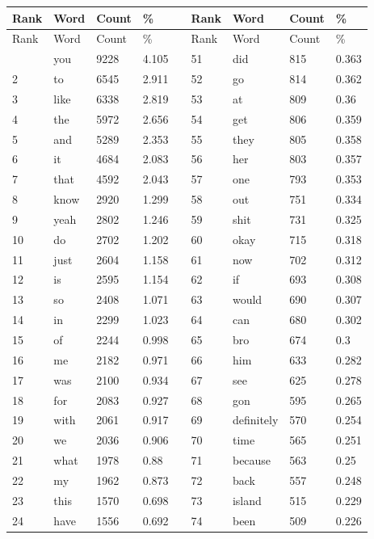 \documentclass[11pt]{article}
\begin{document}
\begin{longtable}{lllllllll}
\toprule
Rank & Word & Count & \% &  & Rank & Word & Count & \% \\
\midrule
\endfirsthead
\toprule
Rank & Word & Count & \% &  & Rank & Word & Count & \% \\
\midrule
\endhead
\bottomrule
\endlastfoot
1 & you & 9228 & 4.105 &  & 51 & did & 815 & 0.363 \\
2 & to & 6545 & 2.911 &  & 52 & go & 814 & 0.362 \\
3 & like & 6338 & 2.819 &  & 53 & at & 809 & 0.36 \\
4 & the & 5972 & 2.656 &  & 54 & get & 806 & 0.359 \\
5 & and & 5289 & 2.353 &  & 55 & they & 805 & 0.358 \\
6 & it & 4684 & 2.083 &  & 56 & her & 803 & 0.357 \\
7 & that & 4592 & 2.043 &  & 57 & one & 793 & 0.353 \\
8 & know & 2920 & 1.299 &  & 58 & out & 751 & 0.334 \\
9 & yeah & 2802 & 1.246 &  & 59 & shit & 731 & 0.325 \\
10 & do & 2702 & 1.202 &  & 60 & okay & 715 & 0.318 \\
11 & just & 2604 & 1.158 &  & 61 & now & 702 & 0.312 \\
12 & is & 2595 & 1.154 &  & 62 & if & 693 & 0.308 \\
13 & so & 2408 & 1.071 &  & 63 & would & 690 & 0.307 \\
14 & in & 2299 & 1.023 &  & 64 & can & 680 & 0.302 \\
15 & of & 2244 & 0.998 &  & 65 & bro & 674 & 0.3 \\
16 & me & 2182 & 0.971 &  & 66 & him & 633 & 0.282 \\
17 & was & 2100 & 0.934 &  & 67 & see & 625 & 0.278 \\
18 & for & 2083 & 0.927 &  & 68 & gon & 595 & 0.265 \\
19 & with & 2061 & 0.917 &  & 69 & definitely & 570 & 0.254 \\
20 & we & 2036 & 0.906 &  & 70 & time & 565 & 0.251 \\
21 & what & 1978 & 0.88 &  & 71 & because & 563 & 0.25 \\
22 & my & 1962 & 0.873 &  & 72 & back & 557 & 0.248 \\
23 & this & 1570 & 0.698 &  & 73 & island & 515 & 0.229 \\
24 & have & 1556 & 0.692 &  & 74 & been & 509 & 0.226 \\

\end{longtable}
\end{document}
